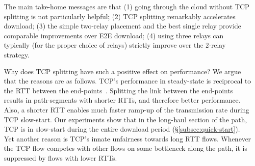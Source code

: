 \documentclass[10pt,sigconf]{acmart}
\newcommand{\mycomm}[3]{{\color{#2} \textbf{[#1: #3]}}}
\newcommand{\mycomm}[3]{}
\newcommand{\IK}[1]{\mycomm{IK}{blue}{#1}}
\newcommand{\AB}[1]{\mycomm{AB}{orange}{#1}}
\newcommand{\NR}[1]{\mycomm{NR}{violet}{#1}}
\providecommand{\ie}{\emph{i.e.,} }
\begin{document}
The main take-home messages are that (1) going through the cloud without TCP splitting is not particularly helpful; (2) TCP splitting remarkably accelerates download; (3) the simple two-relay placement and the best single relay provide comparable improvements over E2E download; (4) using three  relays can typically (for the proper choice of relays) strictly improve over the 2-relay strategy.
 
Why does TCP splitting have such a positive effect on performance? We argue that the reasons are as follows. TCP's performance in steady-state is reciprocal to the RTT between the end-points~\cite{mathis1997}. Splitting the link between the end-points results in path-segments with shorter RTTs, and therefore better performance. Also, a shorter RTT enables much faster ramp-up of the transmission rate during TCP slow-start. Our experiments show that in the long-haul section of the path, TCP is in slow-start during the entire download period (\S\ref{subsec:quick-start}). Yet another reason is TCP's innate unfairness towards long RTT flows. Whenever the TCP flow competes with other flows on some bottleneck along the path, it is suppressed by flows with lower RTTs.






\end{document}
